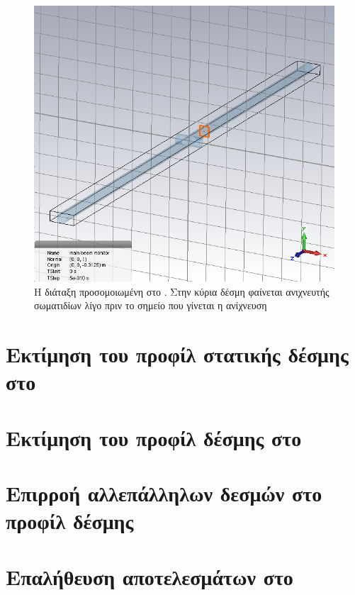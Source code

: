 \begin{figure}[tbh]
\includegraphics[width=\textwidth]{figures/CST-pic-monitor}
\centering
\caption[Η διάταξη προσομοιωμένη στο ]{Η διάταξη προσομοιωμένη στο . 
Στην κύρια δέσμη φαίνεται ανιχνευτής σωματιδίων λίγο πριν το σημείο που γίνεται η ανίχνευση}
\label{fig:CST-PICmonitor}
\end{figure}

\section{Εκτίμηση του προφίλ στατικής δέσμης στο }

\section{Εκτίμηση του προφίλ  δέσμης στο }

\section{Επιρροή αλλεπάλληλων δεσμών στο προφίλ δέσμης}

\section{Επαλήθευση αποτελεσμάτων στο }

